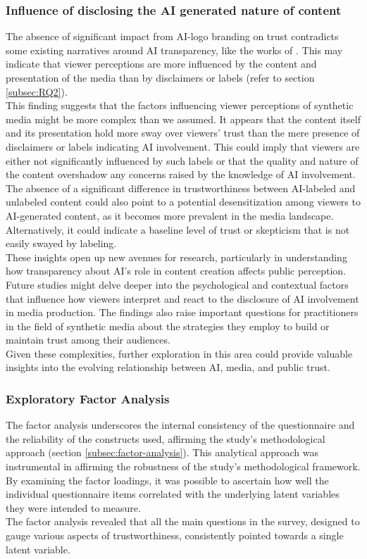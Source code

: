 \documentclass[
  a4paper,  %
  twoside,  %
  bibliography=totoc,
  headsepline,
  cleardoublepage=empty,
  parskip=half,
  draft=false
]{scrbook}
\begin{document}
\subsubsection{Influence of disclosing the AI generated nature of content}
The absence of significant impact from AI-logo branding on trust contradicts some existing narratives around AI transparency, like the works of . This may indicate that viewer perceptions are more influenced by the content and presentation of the media than by disclaimers or labels (refer to section \ref{subsec:RQ2}). \\
This finding suggests that the factors influencing viewer perceptions of synthetic media might be more complex than we assumed. It appears that the content itself and its presentation hold more sway over viewers' trust than the mere presence of disclaimers or labels indicating AI involvement. This could imply that viewers are either not significantly influenced by such labels or that the quality and nature of the content overshadow any concerns raised by the knowledge of AI involvement. \\
The absence of a significant difference in trustworthiness between AI-labeled and unlabeled content could also point to a potential desensitization among viewers to AI-generated content, as it becomes more prevalent in the media landscape. Alternatively, it could indicate a baseline level of trust or skepticism that is not easily swayed by labeling. \\
These insights open up new avenues for research, particularly in understanding how transparency about AI's role in content creation affects public perception. Future studies might delve deeper into the psychological and contextual factors that influence how viewers interpret and react to the disclosure of AI involvement in media production. The findings also raise important questions for practitioners in the field of synthetic media about the strategies they employ to build or maintain trust among their audiences. \\
Given these complexities, further exploration in this area could provide valuable insights into the evolving relationship between AI, media, and public trust.



\subsubsection{Exploratory Factor Analysis}
The factor analysis underscores the internal consistency of the questionnaire and the reliability of the constructs used, affirming the study's methodological approach (section \ref{subsec:factor-analysis}). This analytical approach was instrumental in affirming the robustness of the study's methodological framework. By examining the factor loadings, it was possible to ascertain how well the individual questionnaire items correlated with the underlying latent variables they were intended to measure. \\
The factor analysis revealed that all the main questions in the survey, designed to gauge various aspects of trustworthiness, consistently pointed towards a single latent variable.
\end{document}
